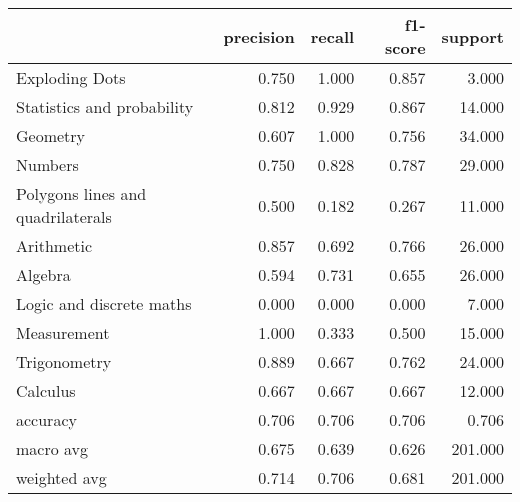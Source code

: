 \begin{tabular}{lrrrr}
\toprule
{} &  precision &  recall &  f1-score &  support \\
\midrule
Exploding Dots                    &      0.750 &   1.000 &     0.857 &    3.000 \\
Statistics and probability        &      0.812 &   0.929 &     0.867 &   14.000 \\
Geometry                          &      0.607 &   1.000 &     0.756 &   34.000 \\
Numbers                           &      0.750 &   0.828 &     0.787 &   29.000 \\
Polygons lines and quadrilaterals &      0.500 &   0.182 &     0.267 &   11.000 \\
Arithmetic                        &      0.857 &   0.692 &     0.766 &   26.000 \\
Algebra                           &      0.594 &   0.731 &     0.655 &   26.000 \\
Logic and discrete maths          &      0.000 &   0.000 &     0.000 &    7.000 \\
Measurement                       &      1.000 &   0.333 &     0.500 &   15.000 \\
Trigonometry                      &      0.889 &   0.667 &     0.762 &   24.000 \\
Calculus                          &      0.667 &   0.667 &     0.667 &   12.000 \\
accuracy                          &      0.706 &   0.706 &     0.706 &    0.706 \\
macro avg                         &      0.675 &   0.639 &     0.626 &  201.000 \\
weighted avg                      &      0.714 &   0.706 &     0.681 &  201.000 \\
\bottomrule
\end{tabular}
